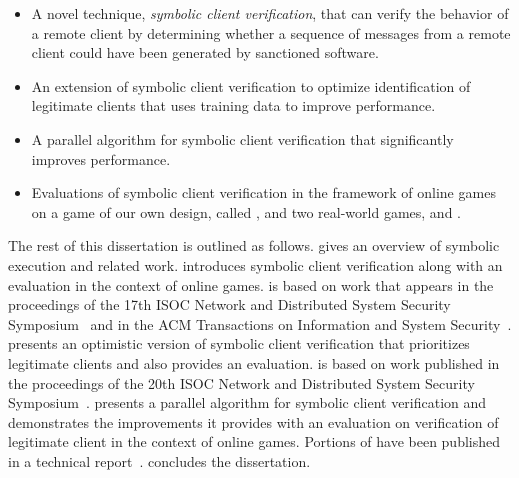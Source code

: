 \begin{itemize}

\item A novel technique, \textit{symbolic client verification}, that
  can verify the behavior of a remote client by determining whether a
  sequence of messages from a remote client could have been generated
  by sanctioned software.

\item An extension of symbolic client verification to optimize
  identification of legitimate clients that uses training data to
  improve performance.

\item A parallel algorithm for symbolic client verification that
  significantly improves performance.

\item Evaluations of symbolic client verification in the framework of
  online games on a game of our own design, called \capman, and two
  real-world games, \xpilot and \tetrinet.

%
%
%

\end{itemize}

The rest of this dissertation is outlined as follows. 
gives an overview of symbolic execution and related work.
 introduces symbolic client verification along with
an evaluation in the context of online games.
 is based on work that appears in the proceedings of the
17th ISOC Network and Distributed System Security
Symposium~\cite{bethea10:games} and
in the ACM Transactions on Information and System
Security~\cite{bethea11:games}.
 presents
an optimistic version of symbolic client verification that prioritizes
legitimate clients and also provides an evaluation.
 is based on work published in the
proceedings of
the 20th ISOC Network and Distributed System Security
Symposium~\cite{cochran13:toward}.
presents a parallel algorithm for symbolic client verification and
demonstrates the improvements it provides with an evaluation on
verification of legitimate client in the context of online games.
Portions of  have been published in a technical report~\cite{chi16:crypto}.
 concludes the dissertation.

